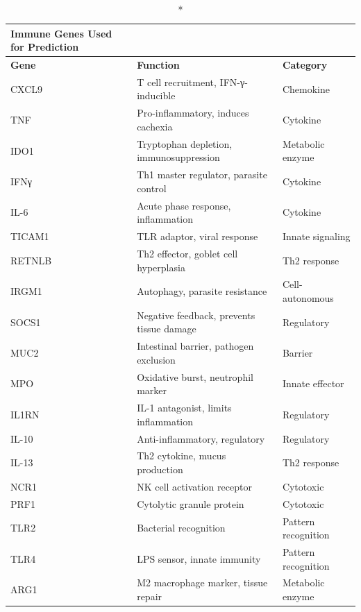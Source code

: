\newlength\holdLTleft\newlength\holdLTright\setlength\holdLTleft{\LTleft}\relax\setlength\holdLTright{\LTright}\relax\setlength{}
\setlength{}\begin{longtable}{@{\extracolsep{\fill}}lll}
\caption*{
{\large \textbf{Immune Genes Used for Prediction}}
} \\ 
\toprule
\textbf{Gene} & \textbf{Function} & \textbf{Category} \\ 
\midrule\addlinespace[2.5pt]
CXCL9 & T cell recruitment, IFN-γ-inducible & Chemokine \\ 
TNF & Pro-inflammatory, induces cachexia & Cytokine \\ 
IDO1 & Tryptophan depletion, immunosuppression & Metabolic enzyme \\ 
IFNγ & Th1 master regulator, parasite control & Cytokine \\ 
IL-6 & Acute phase response, inflammation & Cytokine \\ 
TICAM1 & TLR adaptor, viral response & Innate signaling \\ 
RETNLB & Th2 effector, goblet cell hyperplasia & Th2 response \\ 
IRGM1 & Autophagy, parasite resistance & Cell-autonomous \\ 
SOCS1 & Negative feedback, prevents tissue damage & Regulatory \\ 
MUC2 & Intestinal barrier, pathogen exclusion & Barrier \\ 
MPO & Oxidative burst, neutrophil marker & Innate effector \\ 
IL1RN & IL-1 antagonist, limits inflammation & Regulatory \\ 
IL-10 & Anti-inflammatory, regulatory & Regulatory \\ 
IL-13 & Th2 cytokine, mucus production & Th2 response \\ 
NCR1 & NK cell activation receptor & Cytotoxic \\ 
PRF1 & Cytolytic granule protein & Cytotoxic \\ 
TLR2 & Bacterial recognition & Pattern recognition \\ 
TLR4 & LPS sensor, innate immunity & Pattern recognition \\ 
ARG1 & M2 macrophage marker, tissue repair & Metabolic enzyme \\ 
\bottomrule
\end{longtable}
\setlength\LTleft{\holdLTleft}
\setlength\LTright{\holdLTright}
